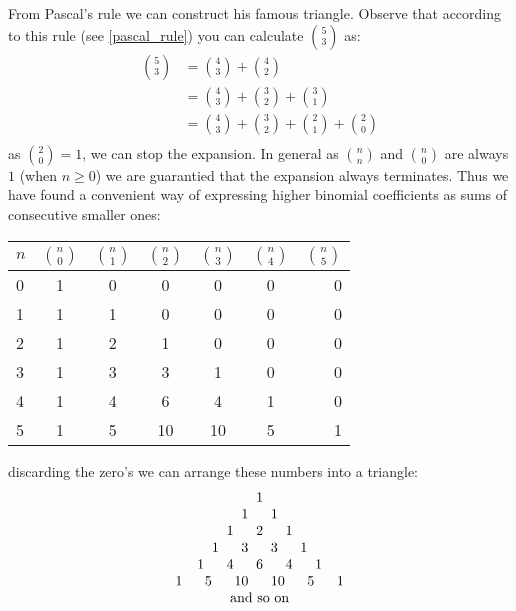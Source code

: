 \myindent From Pascal's rule we can construct his famous triangle. Observe that
according to this rule (see \ref{pascal_rule}) you can calculate $\binom{5}{3}$
as:
\begin{align*}
 \binom{5}{3}
& =  \binom{4}{3} + \binom{4}{2}  \\
& =  \binom{4}{3} + \binom{3}{2} +  \binom{3}{1} \\
& =  \binom{4}{3} + \binom{3}{2} +  \binom{2}{1} + \binom{2}{0} \\
\end{align*}
as $\binom{2}{0} = 1$, we can stop the expansion. In general as $\binom{n}{n}$
and $\binom{n}{0}$ are always $1$ (when $n \geq 0$) we are guarantied that the
expansion always terminates. Thus we have found a convenient way of expressing
higher binomial coefficients as sums of consecutive smaller ones:\\
\begin{center}
\begin{tabular}{l|*{5}{c}r}
\toprule
$n$ & $\binom{n}{0}$        & $\binom{n}{1}$ & $\binom{n}{2}$ & $\binom{n}{3}$ & $\binom{n}{4}$  & $\binom{n}{5}$ \\
\hline
0		& 1                     & 0 			       & 0 			        & 0 			       & 0 			         & 0   \\
1   & 1                     & 1 			       & 0 			        & 0 			       & 0  			       & 0   \\
2   & 1                     & 2 			       & 1 			        & 0 			       & 0  			       & 0   \\
3		& 1                     & 3 			       & 3 			        & 1			         & 0  			       & 0   \\
4		& 1                     & 4 			       & 6 			        & 4			         & 1  			       & 0   \\
5		& 1                     & 5 			       & 10 			      & 10			       & 5  			       & 1   \\
\bottomrule
\end{tabular}
\end{center}
discarding the zero's we can arrange these numbers into a triangle:
\[
\begin{array}{c}
1 \\
1\ \hspace{0.45cm} 1\\
1\ \hspace{0.45cm} 2\ \hspace{0.45cm} 1   \\
1\ \hspace{0.45cm} 3\ \hspace{0.45cm} 3\   \hspace{0.45cm} 1   \\
1\ \hspace{0.45cm} 4\ \hspace{0.45cm} 6\   \hspace{0.45cm} 4\   \hspace{0.45cm} 1\\
1\ \hspace{0.45cm} 5\ \hspace{0.45cm} 10\ \hspace{0.45cm} 10\ \hspace{0.45cm} 5\ \hspace{0.45cm}1\\
\ \textnormal{and so on} \ \\
\end{array}
\]
